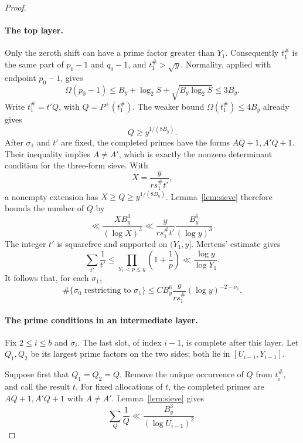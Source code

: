\begin{proof}
\paragraph{The top layer.}
Only the zeroth shift can have a prime factor greater than $Y_1$.
Consequently $t_1^\#$ is the same part of $p_0-1$ and $q_0-1$,
and $t_1^\#>\sqrt y$.  Normality, applied with endpoint $p_0-1$,
gives
\[
 \Omega(p_0-1)
 \le B_y+\log_2 S+\sqrt{B_y\log_2 S}\le3B_y.
\]
Write $t_1^\#=t'Q$, with $Q=P^+(t_1^\#)$.  The weaker bound
$\Omega(t_1^\#)\le4B_y$ already gives
\[
 Q\ge y^{1/(8B_y)}.
\]
After $\sigma_1$ and $t'$ are fixed, the completed primes have the
forms $AQ+1,A'Q+1$.  Their inequality implies $A\ne A'$, which
is exactly the nonzero determinant condition for the three-form
sieve.  With
\[
 X=\frac{y}{r s_1^\#t'},
\]
a nonempty extension has $X\ge Q\ge y^{1/(8B_y)}$.
Lemma~\ref{lem:sieve} therefore bounds the number of $Q$ by
\[
 \ll\frac{X B_y^3}{(\log X)^3}
 \ll\frac{y}{r s_1^\#t'}\frac{B_y^6}{(\log y)^3}.
\]
The integer $t'$ is squarefree and supported on $(Y_1,y]$.
Mertens' estimate gives
\[
 \sum_{t'}\frac1{t'}
 \le\prod_{Y_1<p\le y}\left(1+\frac1p\right)
 \ll\frac{\log y}{\log Y_1}.
\]
It follows that, for each $\sigma_1$,
\begin{equation}\label{eq:top-layer}
 \#\{\sigma_0\text{ restricting to }\sigma_1\}
 \le CB_y^6\frac{y}{r s_1^\#}
       (\log y)^{-2-\nu_1}.
\end{equation}

\paragraph{The prime conditions in an intermediate layer.}
Fix $2\le i\le b$ and $\sigma_i$.  The last slot, of index
$i-1$, is complete after this layer.  Let $Q_1,Q_2$ be its largest
prime factors on the two sides; both lie in
$[U_{i-1},Y_{i-1}]$.

Suppose first that $Q_1=Q_2=Q$.  Remove the unique occurrence of
$Q$ from $t_i^\#$, and call the result $t$.  For fixed allocations
of $t$, the completed primes are $AQ+1,A'Q+1$ with $A\ne A'$.
Lemma~\ref{lem:sieve} gives
\begin{equation}\label{eq:shared-layer-prime}
 \sum_Q\frac1Q\ll\frac{B_y^3}{(\log U_{i-1})^2}.
\end{equation}


\end{proof}

